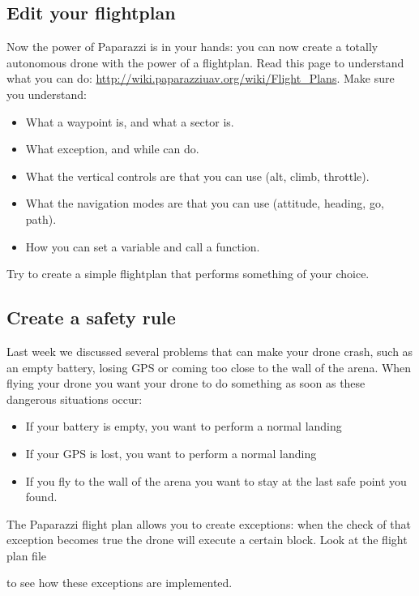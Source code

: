 \subsection*{Edit your flightplan}
Now the power of Paparazzi is in your hands: you can now create a totally autonomous drone with the power of a flightplan. Read this page to understand what you can do: \url{http://wiki.paparazziuav.org/wiki/Flight_Plans}. 
Make sure you understand:
\begin{itemize}
	\item What a waypoint is, and what a sector is. 
	\item What exception, and while can do. 
	\item What the vertical controls are that you can use (alt, climb, throttle).
	\item What the navigation modes are that you can use (attitude, heading, go, path). 
	\item How you can set a variable and call a function. 
\end{itemize}

Try to create a simple flightplan that performs something of your choice. 

\subsection*{Create a safety rule}
Last week we discussed several problems that can make your drone crash, such as an empty battery, losing GPS or coming too close to the wall of the arena.
When flying your drone you want your drone to do something as soon as these dangerous situations occur:
\begin{itemize}
	\item If your battery is empty, you want to perform a normal landing
	\item If your GPS is lost, you want to perform a normal landing
	\item If you fly to the wall of the arena you want to stay at the last safe point you found. 
\end{itemize}
The Paparazzi flight plan allows you to create exceptions: when the check of that exception becomes true the drone will execute a certain block. Look at the flight plan file 

 to see how these exceptions are implemented. 